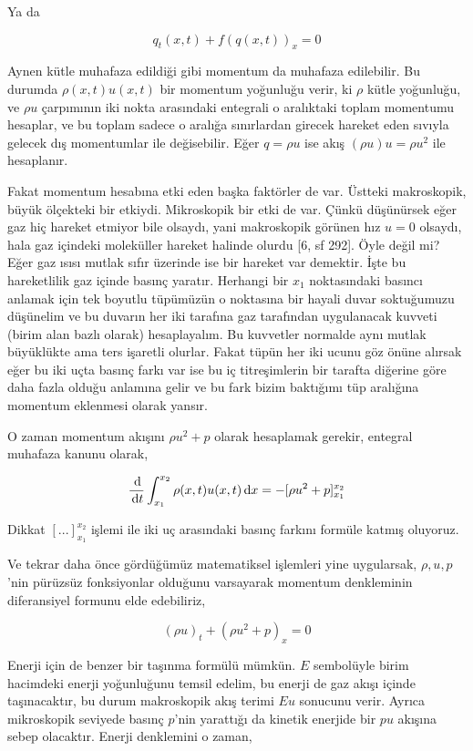 \documentclass[12pt,fleqn]{article}\usepackage{../../common}
\begin{document}
Ya da

$$
q_t(x,t) + f(q(x,t))_x  = 0
$$

Aynen kütle muhafaza edildiği gibi momentum da muhafaza edilebilir. Bu durumda
$\rho(x,t) u(x,t)$ bir momentum yoğunluğu verir, ki $\rho$ kütle yoğunluğu, ve
$\rho u$ çarpımının iki nokta arasındaki entegrali o aralıktaki toplam momentumu
hesaplar, ve bu toplam sadece o aralığa sınırlardan girecek hareket eden sıvıyla
gelecek dış momentumlar ile değisebilir. Eğer $q = \rho u$ ise akış
$(\rho u) u = \rho u^2$ ile hesaplanır.

Fakat momentum hesabına etki eden başka faktörler de var. Üstteki makroskopik,
büyük ölçekteki bir etkiydi. Mikroskopik bir etki de var. Çünkü düşünürsek eğer
gaz hiç hareket etmiyor bile olsaydı, yani makroskopik görünen hız $u=0$
olsaydı, hala gaz içindeki moleküller hareket halinde olurdu [6, sf 292]. Öyle
değil mi?  Eğer gaz ısısı mutlak sıfır üzerinde ise bir hareket var
demektir. İşte bu hareketlilik gaz içinde basınç yaratır. Herhangi bir $x_1$
noktasındaki basıncı anlamak için tek boyutlu tüpümüzün o noktasına bir hayali
duvar soktuğumuzu düşünelim ve bu duvarın her iki tarafına gaz tarafından
uygulanacak kuvveti (birim alan bazlı olarak) hesaplayalım. Bu kuvvetler
normalde aynı mutlak büyüklükte ama ters işaretli olurlar. Fakat tüpün her
iki ucunu göz önüne alırsak eğer bu iki uçta basınç farkı var ise bu
iç titreşimlerin bir tarafta diğerine göre daha fazla olduğu anlamına gelir
ve bu fark bizim baktığımı tüp aralığına momentum eklenmesi olarak yansır.

O zaman momentum akışını $\rho u^2 + p$ olarak hesaplamak gerekir, entegral
muhafaza kanunu olarak,

$$
\frac{\,\mathrm{d}}{\,\mathrm{d} t} \int _{x_1}^{x_2} 
\rho(x,t) u(x,t) \,\mathrm{d} x = - [\rho u^2 + p] _{x_1}^{x_2}
$$

Dikkat $[ ... ]_{x_1}^{x_2}$ işlemi ile iki uç arasındaki basınç farkını
formüle katmış oluyoruz.

Ve tekrar daha önce gördüğümüz matematiksel işlemleri yine uygularsak,
$\rho,u,p$'nin pürüzsüz fonksiyonlar olduğunu varsayarak momentum denkleminin
diferansiyel formunu elde edebiliriz,

$$
(\rho u)_t + (\rho u^2 + p)_x = 0
$$

Enerji için de benzer bir taşınma formülü mümkün. $E$ sembolüyle birim hacimdeki
enerji yoğunluğunu temsil edelim, bu enerji de gaz akışı içinde taşınacaktır, bu
durum makroskopik akış terimi $E u$ sonucunu verir. Ayrıca mikroskopik seviyede
basınç $p$'nin yarattığı da kinetik enerjide bir $pu$ akışına sebep olacaktır.
Enerji denklemini o zaman,
\end{document}
